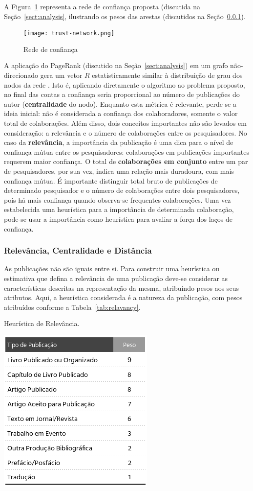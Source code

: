 \documentclass[12pt]{article}
\begin{document}
A Figura~\ref{fig:network} representa a rede de confiança proposta (discutida na Seção~\ref{sect:analysis}, ilustrando os pesos das arestas (discutidos na Seção~\ref{sect:relevancy}).

  \begin{figure}[ht]
    \centering
    \texttt{[image: trust-network.png]}
    \caption{Rede de confiança}
    \label{fig:network}
  \end{figure}

A aplicação do PageRank (discutido na Seção~\ref{sect:analysis}) em um grafo não-direcionado gera um vetor $R$ estatisticamente similar à distribuição de grau dos nodos da rede \cite{perra2008spectral}. Isto é, aplicando diretamente o algoritmo ao problema proposto, no final das contas a confiança seria proporcional ao número de publicações do autor (\textbf{centralidade} do nodo). Enquanto esta métrica é relevante, perde-se a ideia inicial: não é considerada a confiança dos colaboradores, somente o valor total de colaborações. Além disso, dois conceitos importantes não são levados em consideração: a relevância e o número de colaborações entre os pesquisadores. No caso da \textbf{relevância}, a importância da publicação é uma dica para o nível de confiança mútua entre os pesquisadores: colaborações em publicações importantes requerem maior confiança. O total de \textbf{colaborações em conjunto} entre um par de pesquisadores, por sua vez, indica uma relação mais duradoura, com mais confiança mútua. É importante distinguir total bruto de publicações de determinado pesquisador e o número de colaborações entre dois pesquisadores, pois há mais confiança 
quando observa-se frequentes colaborações.  Uma vez estabelecida uma heurística para a importância de determinada colaboração, pode-se usar a importância como heurística para avaliar a força dos laços de confiança.

\subsubsection{Relevância, Centralidade e Distância} \label{sect:relevancy}

As publicações não são iguais entre si. Para construir uma heurística ou estimativa que defina a relevância de uma publicação deve-se considerar as características descritas na representação da mesma, atribuindo pesos aos seus atributos. Aqui, a heurística considerada é a natureza da publicação, com pesos atribuídos conforme a Tabela~\ref{tab:relavancy}.


\begin{table}[ht]
    \centering
    \caption{Heurística de Relevância.}
    \label{tab:relavancy}
    \includegraphics[width=.35\textwidth]{heuristics.png}
\end{table}
\end{document}
